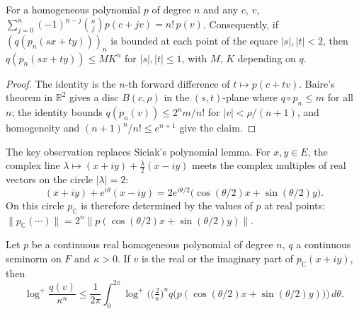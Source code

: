 \begin{lemma}
  \label{lem:fwd-diff}
  \leanok
  For a homogeneous polynomial $p$ of degree $n$ and any $c$, $v$,
  $\sum_{j=0}^n (-1)^{n-j} \binom{n}{j} p(c + jv) = n!\, p(v)$. Consequently, if
  $(q(p_n(sx + ty)))_n$ is bounded at each point of the square $|s|, |t| < 2$, then
  $q(p_n(sx + ty)) \le M K^n$ for $|s|, |t| \le 1$, with $M$, $K$ depending on $q$.
\end{lemma}

\begin{proof}
  \leanok
  The identity is the $n$-th forward difference of $t \mapsto p(c + tv)$. Baire's theorem in
  $\mathbb{R}^2$ gives a disc $B(c, \rho)$ in the $(s, t)$-plane where $q \circ p_n \le m$ for
  all $n$; the identity bounds $q(p_n(v)) \le 2^n m / n!$ for $|v| < \rho/(n+1)$, and
  homogeneity and $(n+1)^n / n! \le e^{n+1}$ give the claim.
\end{proof}

The key observation replaces Siciak's polynomial lemma. For $x, y \in E$, the complex line
$\lambda \mapsto (x + iy) + \tfrac{\lambda}{2}(x - iy)$ meets the complex multiples of real
vectors on the circle $|\lambda| = 2$:
\[
  (x + iy) + e^{i\theta}(x - iy) = 2 e^{i\theta/2} \big(\cos(\theta/2) x + \sin(\theta/2) y\big).
\]
On this circle $p_{\mathbb{C}}$ is therefore determined by the values of $p$ at real points:
$\|p_{\mathbb{C}}(\cdots)\| = 2^n \|p(\cos(\theta/2) x + \sin(\theta/2) y)\|$.

\begin{lemma}
  \label{lem:jensen-aux-line}
  \leanok
  Let $p$ be a continuous real homogeneous polynomial of degree $n$, $q$ a continuous seminorm on
  $F$ and $\kappa > 0$. If $v$ is the real or the imaginary part of $p_{\mathbb{C}}(x + iy)$, then
  \[
    \log^+ \frac{q(v)}{\kappa^n} \le \frac{1}{2\pi} \int_0^{2\pi}
      \log^+ \Big( \big(\tfrac{2}{\kappa}\big)^n q\big(p(\cos(\theta/2) x + \sin(\theta/2) y)\big)
      \Big) \, d\theta .
  \]
\end{lemma}

